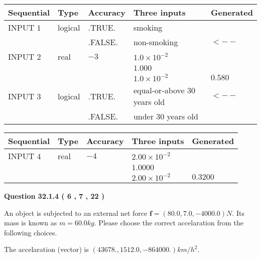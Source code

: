 \documentclass[12pt]{article}
\begin{document}
   
  
  
\noindent\begin{tabular}{|l|l|l|l|l|}
\hline
 Sequential & Type & Accuracy & Three inputs & Generated \\ 
\hline
 
 
  INPUT $            1 $ & logical & .TRUE. & 
 smoking & 
  \\
  & & .FALSE. & 
  non-smoking & 
  $ <-- $ 
 \\  \hline  
 
 
  INPUT $            2 $ & real & $           -3  $ & $
 1.0 \times 10^{-2}
  $ & \\
  & & &  $
 1.000
  $ & \\
  & & &  $
 1.0 \times 10^{-2}
 $ & $ 0.580 $ 
 \\  \hline  
 
 
  INPUT $            3 $ & logical & .TRUE. & 
 equal-or-above 30 years old & 
  $ <-- $ 
  \\
  & & .FALSE. & 
  under 30 years old & 
 \\  \hline  
 \end{tabular}
   
   
  
  
\noindent\begin{tabular}{|l|l|l|l|l|}
\hline
 Sequential & Type & Accuracy & Three inputs & Generated \\ 
\hline
 
 
  INPUT $            4 $ & real & $           -4  $ & $
 2.00 \times 10^{-2}
  $ & \\
  & & &  $
 1.0000
  $ & \\
  & & &  $
 2.00 \times 10^{-2}
 $ & $ 0.3200 $ 
 \\  \hline  
 \end{tabular}
   
   
  
\vspace{0.2in}
  
{\textbf{\Large{Question
32.1.4 
 (           6 ,           7 ,          22 )
}}}
  
  
 
An object is subjected to an external net force $\mathbf{f}=(
80.0 ,
7.0,
-4000.0  )N$. Its mass is known as
$m= %
60.0  kg$. Please choose the correct accelaration
from the following choices.
 
 
 
The accelaration (vector) is
$(
43678.,
1512.0 ,
-864000.
)km/h^2.
$
 
\end{document}
